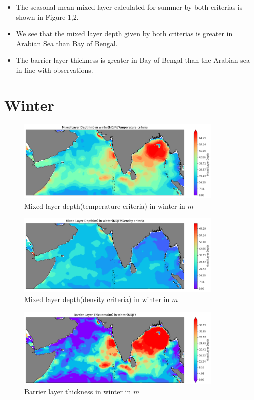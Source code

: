 \documentclass[20pt]{article}
\begin{document}
\begin{itemize}
    \item The seasonal mean mixed layer calculated for summer by both criterias is shown in Figure 1,2.
    \item We see that the mixed layer depth given by both criterias is greater in Arabian Sea than Bay of Bengal.
    \item The barrier layer thickness is greater in Bay of Bengal than the Arabian sea in line with observations.
\end{itemize}

\section*{Winter}

\begin{figure}
    \centering
    \includegraphics[width=0.88\textwidth]{temp_winter.png}
    \caption{Mixed layer depth(temperature criteria) in winter in $m$}
\end{figure}

\begin{figure}
    \centering
    \includegraphics[width=0.88\textwidth]{density_winter.png}
    \caption{Mixed layer depth(density criteria) in winter in $m$}
\end{figure}

\begin{figure}
    \centering
    \includegraphics[width=0.88\textwidth]{blt_winter.png}
    \caption{Barrier layer thickness in winter in $m$}
\end{figure}
\end{document}
